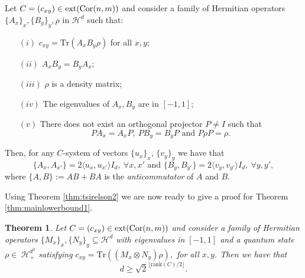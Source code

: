 \documentclass{siamart}
\newtheorem*{thmnewww}{Theorem}
\begin{document}
\begin{theorem}\cite[Theorem 3.1]{TS87}\label{thm:tsirelson2} Let  $C=(c_{xy}) \in {\rm ext}({\rm Cor}(n,m))$
and consider a family of Hermitian operators $\{A_x\}_x,\{B_y\}_y,  \rho$ in $ {\mathcal{H}}^d$  such that:
\begin{itemize}
\item[$(i)$] $c_{xy}={\mathrm{Tr}}(A_xB_y\rho)$ for all $x,y$;
\item[$(ii)$] $A_xB_y=B_yA_x$;
\item[$(iii)$] $\rho$ is a density matrix;
\item[$(iv)$] The eigenvalues of $A_x,B_y$ are in $[-1,1]$;
\item[$(v)$] There does not exist an orthogonal  projector $P\ne I$ such
that 
\begin{equation}\label{dcefe} PA_x=A_xP, \
PB_y=B_yP \text{ and } P\rho P=\rho. \end{equation} \end{itemize} Then, for any
$C$-system of vectors {$\{ u_x \}_x$, $\{ v_y \}_{y}$} we have that
\begin{equation}\label{eq:cliffordtsirelson} \{A_x,A_{x'}\}=2{\langle} u_x,u_{x'}{\rangle}
I_d,\  \forall x,x' \text{ and }\{B_{y},B_{y'}\}=2{\langle} v_y,v_{y'}{\rangle}
I_d,\  \forall y,y', \end{equation} 
{where $\{A, B \} := AB + BA$ is the \emph{anticommutator} of $A$ and $B$.}
\end{theorem}
\medskip

Using Theorem \ref{thm:tsirelson2} we  are now ready to  give a proof for Theorem \ref{thm:mainlowerbound1}.

\medskip
\begin{thmnewww}\label{thm:lowerboundandproof}
Let $C=(c_{xy}) \in {{\rm ext}({\mathrm{Cor}(n,m)})}$  and consider a  family of   Hermitian operators
$\{M_x\}_{x}, \{N_y\}_{y}\subseteq {\mathcal{H}}^d$ with eigenvalues  in $[-1,1]$ and a quantum state $\rho\in~{\mathcal{H}}^{d^2}_+$ satisfying
$c_{xy}={\mathrm{Tr}}((M_x\otimes N_y)\rho),$ for all $x,y$. Then we have that
$$d\ge {\sqrt{2}^{\lfloor{\mathrm{rank}}(C)/ 2\rfloor}}.$$
\end{thmnewww}
\medskip
\end{document}
